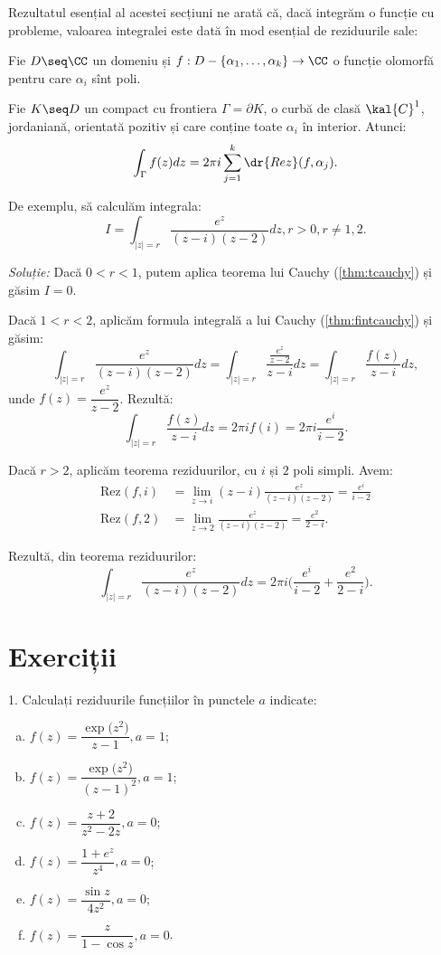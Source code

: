 Rezultatul esențial al acestei secțiuni ne arată că, dacă integrăm o funcție
cu probleme, valoarea integralei este dată în mod esențial de reziduurile sale:

\begin{theorem}\label{thm:t-rez}
  Fie $ D \seq \CC $ un domeniu și $ f : D - \{ \alpha_1, \dots, \alpha_k \} \to \CC $ o funcție
  olomorfă pentru care $ \alpha_i $ sînt poli.

  Fie $ K \seq D $ un compact cu frontiera $ \Gamma = \partial K $, o curbă de clasă
  $ \kal{C}^1 $, jordaniană, orientată pozitiv și care conține toate $ \alpha_i $ în
  interior. Atunci:
  \[
    \int_\Gamma f(z) dz = 2 \pi i \sum_{j = 1}^k \dr{Rez}(f, \alpha_j).
  \]
\end{theorem}

De exemplu, să calculăm integrala:
\[
  I = \int_{|z| = r} \frac{e^z}{(z - i)(z - 2)} dz, r > 0, r \neq 1, 2.
\]

\emph{Soluție:} Dacă $ 0 < r < 1 $, putem aplica teorema lui Cauchy (\ref{thm:tcauchy})
și găsim $ I = 0 $.

Dacă $ 1 < r < 2 $, aplicăm formula integrală a lui Cauchy (\ref{thm:fintcauchy}) și găsim:
\[
  \int_{|z| = r} \frac{e^z}{(z - i)(z - 2)} dz = %
  \int_{|z| = r} \frac{\frac{e^z}{z - 2}}{z - i} dz = %
  \int_{|z| = r} \frac{f(z)}{z - i} dz,
\]
unde $ f(z) = \dfrac{e^z}{z - 2} $. Rezultă:
\[
  \int_{|z| = r} \frac{f(z)}{z - i} dz = 2 \pi i f(i) = 2 \pi i \frac{e^i}{i - 2}.
\]

Dacă $ r > 2 $, aplicăm teorema reziduurilor, cu $ i $ și $ 2 $ poli simpli. Avem:
\begin{align*}
  \mathrm{Rez}(f, i) &= \lim_{z \to i} (z - i) \frac{e^z}{(z - i)(z - 2)} = \frac{e^i}{i - 2} \\
  \mathrm{Rez}(f, 2) &= \lim_{z \to 2} \frac{e^z}{(z - i)(z - 2)} = \frac{e^2}{2 - i}.
\end{align*}

Rezultă, din teorema reziduurilor:
\[
  \int_{|z| = r} \frac{e^z}{(z - i)(z - 2)} dz = 2 \pi i \Big( \frac{e^i}{i - 2} + %
  \frac{e^2}{2 - i} \Big).
\]


\section{Exerciții}

1. Calculați reziduurile funcțiilor în punctele $ a $ indicate:
\begin{enumerate}[(a)]
\item $ f(z) = \dfrac{\exp\big(z^2\big)}{z - 1}, a = 1 $;
\item $ f(z) = \dfrac{\exp\big(z^2\big)}{(z - 1)^2}, a = 1 $;
\item $ f(z) = \dfrac{z + 2}{z^2 - 2z}, a = 0 $;
\item $ f(z) = \dfrac{1 + e^z}{z^4}, a = 0 $;
\item $ f(z) = \dfrac{\sin z}{4z^2}, a = 0 $;
\item $ f(z) = \dfrac{z}{1 - \cos z}, a = 0 $.
\end{enumerate}

